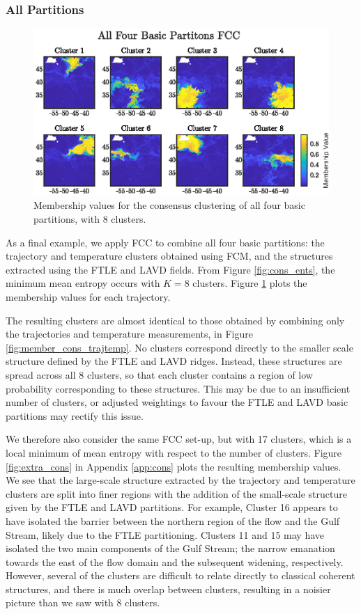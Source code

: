\documentclass[a4paper, fontsize=12pt]{article}
\begin{document}
\subsubsection{All Partitions}
\begin{figure}
\begin{center}
	\includegraphics[scale=1.3]{../figures/atlantic_member_all.eps}
	\caption{Membership values for the consensus clustering of all four basic partitions, with 8 clusters.}
	\label{fig:member_cons_all}
\end{center}
\end{figure}
As a final example, we apply FCC to combine all four basic partitions: the trajectory and temperature clusters obtained using FCM, and the structures extracted using the FTLE and LAVD fields. From Figure \ref{fig:cons_ents}, the minimum mean entropy occurs with \(K = 8\) clusters. Figure \ref{fig:member_cons_all} plots the membership values for each trajectory. 

The resulting clusters are almost identical to those obtained by combining only the trajectories and temperature measurements, in Figure \ref{fig:member_cons_trajtemp}. No clusters correspond directly to the smaller scale structure defined by the FTLE and LAVD ridges. Instead, these structures are spread across all 8 clusters, so that each cluster contains a region of low probability corresponding to these structures. This may be due to an insufficient number of clusters, or adjusted weightings to favour the FTLE and LAVD basic partitions may rectify this issue.

We therefore also consider the same FCC set-up, but with 17 clusters, which is a local minimum of mean entropy with respect to the number of clusters. Figure \ref{fig:extra_cons} in Appendix \ref{app:cons} plots the resulting membership values. We see that the large-scale structure extracted by the trajectory and temperature clusters are split into finer regions with the addition of the small-scale structure given by the FTLE and LAVD partitions. For example, Cluster 16 appears to have isolated the barrier between the northern region of the flow and the Gulf Stream, likely due to the FTLE partitioning. Clusters 11 and 15 may have isolated the two main components of the Gulf Stream; the narrow emanation towards the east of the flow domain and the subsequent widening, respectively. However, several of the clusters are difficult to relate directly to classical coherent structures, and there is much overlap between clusters, resulting in a noisier picture than we saw with 8 clusters.
\end{document}
